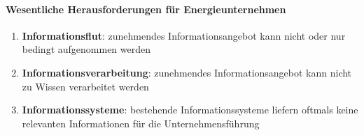 \paragraph{Wesentliche Herausforderungen für Energieunternehmen \citep[S. 21]{Doleski2016}}
\begin{enumerate}
  \item \textbf{Informationsflut}: zunehmendes Informationsangebot kann nicht oder nur bedingt aufgenommen werden
  \item \textbf{Informationsverarbeitung}: zunehmendes Informationsangebot kann nicht zu Wissen verarbeitet werden
  \item \textbf{Informationssysteme}: bestehende Informationssysteme liefern oftmals keine relevanten Informationen für die Unternehmensführung
\end{enumerate}
